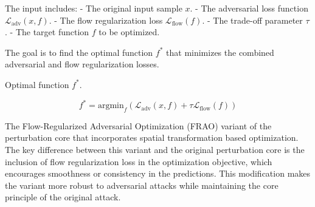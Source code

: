The input includes:
- The original input sample \( x \).
- The adversarial loss function \( \mathcal{L}_{\text{adv}}(x, f) \).
- The flow regularization loss \( \mathcal{L}_{\text{flow}}(f) \).
- The trade-off parameter \( \tau \).
- The target function \( f \) to be optimized.

The goal is to find the optimal function \( f^* \) that minimizes the combined adversarial and flow regularization losses.


Optimal function $f^*$.

\[
f^* = \text{argmin}_f \left( \mathcal{L}_{\text{adv}}(x, f) + \tau \mathcal{L}_{\text{flow}}(f) \right)
\]

The Flow-Regularized Adversarial Optimization (FRAO) variant of the perturbation core that incorporates spatial transformation based optimization. The key difference between this variant and the original perturbation core is the inclusion of flow regularization loss in the optimization objective, which encourages smoothness or consistency in the predictions. This modification makes the variant more robust to adversarial attacks while maintaining the core principle of the original attack.